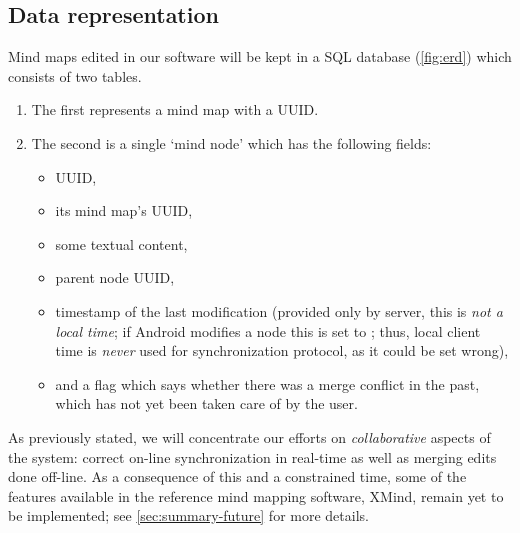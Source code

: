 %
%
%
%
%

\subsection{Data representation}
\label{subsec:data-repr}

Mind maps edited in our software will be kept in a SQL database (\cref{fig:erd}) which consists of two tables.

\begin{enumerate}
	\item The first represents a mind map with a UUID.
	\item The second is a single `mind node' which has the following fields: \begin{itemize}
		\item UUID,
		\item its mind map's UUID,
		\item some textual content,
		\item parent node UUID,
		\item timestamp of the last modification (provided only by server, this is \emph{not a local time}; if Android modifies a node this is set to ; thus, local client time is \emph{never} used for synchronization protocol, as it could be set wrong),
		\item and a flag which says whether there was a merge conflict in the past, which has not yet been taken care of by the user.
	\end{itemize}
\end{enumerate}

As previously stated, we will concentrate our efforts on \emph{collaborative} aspects of the system: correct on-line synchronization in real-time as well as merging edits done off-line. As a consequence of this and a constrained time, some of the features available in the reference mind mapping software, XMind, remain yet to be implemented; see \cref{sec:summary-future} for more details.

